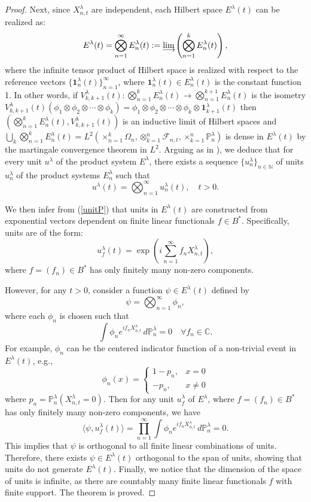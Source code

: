 \documentclass[11pt]{amsart}
\theoremstyle{definition}
\theoremstyle{remark}
\numberwithin{equation}{section}
\newcommand{\m}{\mathcal }
\def\limind{\mathop{\oalign{lim\cr
\hidewidth$\longrightarrow$\hidewidth\cr}}}
\begin{document}
\begin{proof}
 
 Next, since  \( X_{n,t}^\lambda\) are independent, each Hilbert space \(E^\lambda(t)\) can be realized as:  \[ E^\lambda(t) = \bigotimes_{n=1}^\infty E_n^\lambda(t):=\limind\left( \bigotimes_{n=1}^k E_n^\lambda(t) \right), \] where  the infinite tensor product of Hilbert space is realized with respect to the reference vectors \(\{\bm{1}_n^\lambda(t)\}_{n=1}^\infty\), where \(\bm{1}_n^\lambda(t)\in E_n^\lambda(t) \) is the constant function 1. In other words, if \(V_{k,k+1}^\lambda(t):\bigotimes_{n=1}^k E_n^\lambda(t)\to\bigotimes_{n=1}^{k+1} E_n^\lambda(t)\) is the isometry \(V_{k,k+1}^\lambda(t)(\phi_1\otimes \phi_2\otimes\cdots \otimes \phi_k)=\phi_1\otimes \phi_2\otimes\cdots \otimes \phi_k\otimes \bm{1}_{k+1}^\lambda(t)\) then \(\left(\bigotimes_{n=1}^{k} E_n^\lambda(t), V_{k,k+1}^\lambda(t)\right)\) is an inductive limit of Hilbert spaces and \(\bigcup_k  \bigotimes_{n=1}^{k} E_n^\lambda(t)=L^2(\times_{n=1}^k\Omega_n, \otimes_{k=1}^n\m{F}_{n,t}, \times_{k=1}^n\mathbb{P}_n^\lambda)\) is dense in  \(E^\lambda(t)\) by the martingale convergence theorem in \(L^2\). Arguing as in \cite[Theorem 4.2]{Flor}), we deduce that for every unit \(u^\lambda\) of the product system \(E^\lambda\), there exists a sequence \(\{u_n^\lambda\}_{n\in\mathbb{N}}\)  of units \(u_n^\lambda\) of the product systems \(E^\lambda_n\) such that \[ u^\lambda(t)=\bigotimes_{n=1}^\infty u_n^\lambda(t),\quad t>0.\]
 
 We then infer  from (\ref{unitP}) that units in \( E^\lambda(t) \) are constructed from exponential vectors dependent on finite linear functionals \( f \in B^* \). Specifically, units are of the form:
\[u_f^\lambda(t) = \exp\left( i \sum_{n=1}^\infty f_n X_{n,t}^\lambda \right),\]
 where \( f = (f_n)\in B^* \) has only finitely many non-zero components.

However, for any \(t>0\), consider a function \( \psi \in E^\lambda(t) \) defined by \[
 \psi = \bigotimes_{n=1}^\infty \phi_n,\] where each \( \phi_n \) is chosen such that \[
\int \phi_n e^{i f_n X_{n,t}^\lambda} \, d\mathbb{P}_n^\lambda = 0 \quad \forall f_n \in \mathbb{C}.
\] For example, \(\phi_n\) can be the centered indicator function of a non-trivial event in \(E^\lambda(t)\), e.g., \[\phi_n(x) =\left\{\begin{array}{ll}1-p_n, & x=0\\-p_n,&x\neq 0\end{array}\right.\] where \(p_n=\mathbb{P}_n^\lambda(X_{n,t}^\lambda=0).\) Then for any unit \(u_f^\lambda\) of \(E^\lambda\),  where \( f = (f_n)\in B^* \) has only finitely many non-zero components, we have \[  \langle \psi, u_f^\lambda(t) \rangle=\prod_{n=1}^\infty
\int \phi_n e^{i f_n X_{n,t}^\lambda} \, d\mathbb{P}_n^\lambda =0.\]
This implies that \( \psi \) is orthogonal to all finite linear combinations of units. Therefore, there exists \( \psi \in E^\lambda(t) \) orthogonal to the span of units, showing that units do not generate \( E^\lambda(t) \). Finally, we notice that the dimension of the space of units is infinite, as there are countably many finite linear functionals \(
f\) with finite support. The theorem is proved.
\end{proof}
\end{document}

